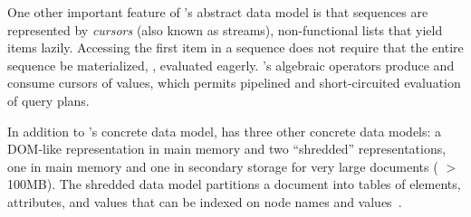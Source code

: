 One other important feature of \Galax{}'s abstract data model is that
sequences are represented by \emph{cursors} (also known as streams),
non-functional lists that yield items lazily.  Accessing the first
item in a sequence does not require that the entire sequence be
materialized, \ie{}, evaluated eagerly.  \Galax{}'s algebraic
operators produce and consume cursors of values, which permits
pipelined and short-circuited evaluation of query plans.

In addition to \padx{}'s concrete data model, \Galax{} has three other
concrete data models: a DOM-like representation in main memory and two
``shredded'' representations, one in main memory and one in secondary
storage for very large documents (\eg{} $>$ 100MB).  The shredded data
model partitions a document into tables of elements, attributes, and
values that can be indexed on node names and
values~\cite{galax:ximep2004}.


